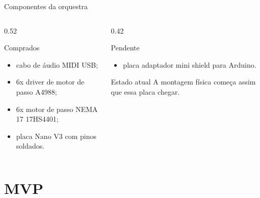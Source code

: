 \documentclass{beamer}
\begin{document}
\begin{frame}{Componentes da orquestra}
    \begin{columns}[T,onlytextwidth]
        \begin{column}{0.52\textwidth}
            \begin{block}{Comprados}
                \begin{itemize}
                    \item cabo de áudio MIDI USB;
                    \item 6x driver de motor de passo A4988;
                    \item 6x motor de passo NEMA 17 17HS4401;
                    \item placa Nano V3 com pinos soldados.
                \end{itemize}
            \end{block}
        \end{column}
        \begin{column}{0.42\textwidth}
            \begin{alertblock}{Pendente}
                \begin{itemize}
                    \item placa adaptador mini shield para Arduino.
                \end{itemize}
            \end{alertblock}

            \vspace{0.2cm}

            \begin{block}{Estado atual}
                A montagem física começa assim que essa placa chegar.
            \end{block}
        \end{column}
    \end{columns}
\end{frame}

\section{MVP}
\end{document}
